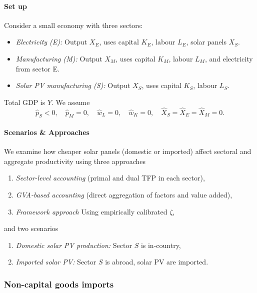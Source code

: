 \documentclass[11pt]{article}
\begin{document}
\paragraph{Set up}
Consider a small economy with three sectors:
\begin{itemize}
\item \textit{Electricity (E):} Output $X_E$, uses capital $K_E$, labour $L_E$, solar panels $X_S$.
\item \textit{Manufacturing (M):} Output $X_M$, uses capital $K_M$, labour $L_M$, and electricity from sector E.
\item \textit{Solar PV manufacturing (S):} Output $X_S$, uses capital $K_S$, labour $L_S$.
\end{itemize}
Total GDP is $Y$. We assume
\begin{equation*}
    \hat{p}_S<0,\quad \hat{p}_M=0,\quad \hat{w}_L=0,\quad \hat{w}_K=0,\quad \hat{X}_S=\hat{X}_E=\hat{X}_M=0.
\end{equation*}

\paragraph{Scenarios \& Approaches} We examine how cheaper solar panels (domestic or imported) affect sectoral and aggregate productivity using three approaches

\begin{enumerate}
\item \textit{Sector-level accounting} (primal and dual TFP in each sector),
\item \textit{GVA-based accounting} (direct aggregation of factors and value added),
\item \textit{Framework approach} Using empirically calibrated $\zeta$,
\end{enumerate}
and two scenarios
\begin{enumerate}[\indent A.]
    \item \textit{Domestic solar PV production:} Sector $S$ is in-country,
    \item \textit{Imported solar PV:} Sector $S$ is abroad, solar PV are imported.
\end{enumerate}



\subsubsection{Non-capital goods imports}
\label{app_section_import_intermediate}
\end{document}
